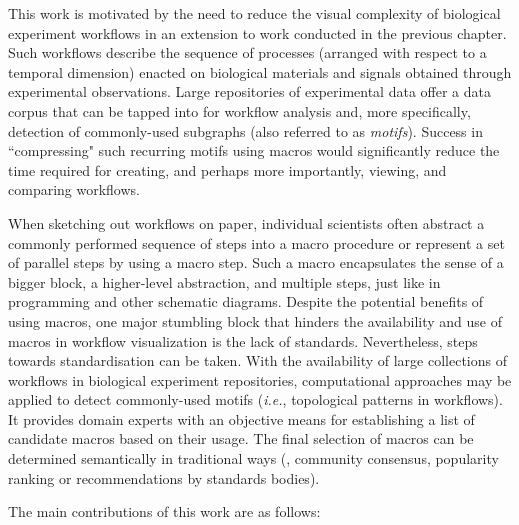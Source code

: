 This work is motivated by the need to reduce the visual complexity of biological experiment workflows in an extension to work conducted in the previous chapter.
Such workflows describe the sequence of processes (arranged with respect to a temporal dimension) enacted on biological materials and signals obtained through experimental observations.
Large repositories of experimental data offer a data corpus that can be tapped into for workflow analysis and, more specifically, detection of commonly-used subgraphs (also referred to as \emph{motifs}).
Success in ``compressing" such recurring motifs using macros would significantly reduce the time required for creating, and perhaps more importantly, viewing, and comparing workflows.

When sketching out workflows on paper, individual scientists often abstract a commonly performed sequence of steps into a macro procedure or represent a set of parallel steps by using a macro step.
Such a macro encapsulates the sense of a bigger block, a higher-level abstraction, and multiple steps, just like in programming and other schematic diagrams.
Despite the potential benefits of using macros, one major stumbling block that hinders the availability and use of macros in workflow visualization is the lack of standards.
Nevertheless, steps towards standardisation can be taken.
With the availability of large collections of workflows in biological experiment repositories, computational approaches may be applied to detect commonly-used motifs (\emph{i.e.}, topological patterns in workflows).
It provides domain experts with an objective means for establishing a list of candidate macros based on their usage.
The final selection of macros can be determined semantically in traditional ways (\eg, community consensus, popularity ranking or recommendations by standards bodies).

The main contributions of this work are as follows:

